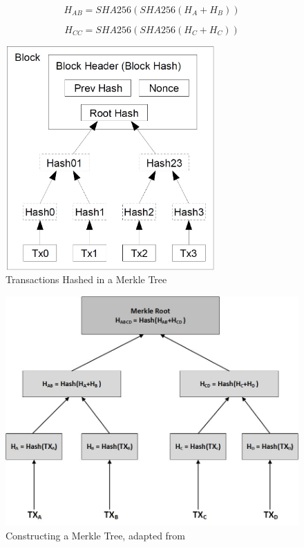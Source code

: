 \begin{equation}
  \label{eq:2}
H_{AB} = SHA256(SHA256(H_{A} + H_{B}))
\end{equation}

\begin{equation}
  \label{eq:3}
 H_{CC} = SHA256(SHA256(H_{C} + H_{C}))
\end{equation}


\begin{figure}[h]
	\centering
    \includegraphics[width=80mm,scale=0.5]{figs/blockdisected}
	\caption{Transactions Hashed in a Merkle Tree \cite{paper:001}}
	\label{fig:blockdisected}
\end{figure}

\begin{figure}[h]
	\centering
    \includegraphics[width=120mm,scale=0.5]{figs/mtree}
	\caption{Constructing a Merkle Tree, adapted from \cite{andy_mb}}
	\label{fig:mtree}
\end{figure}
\clearpage

